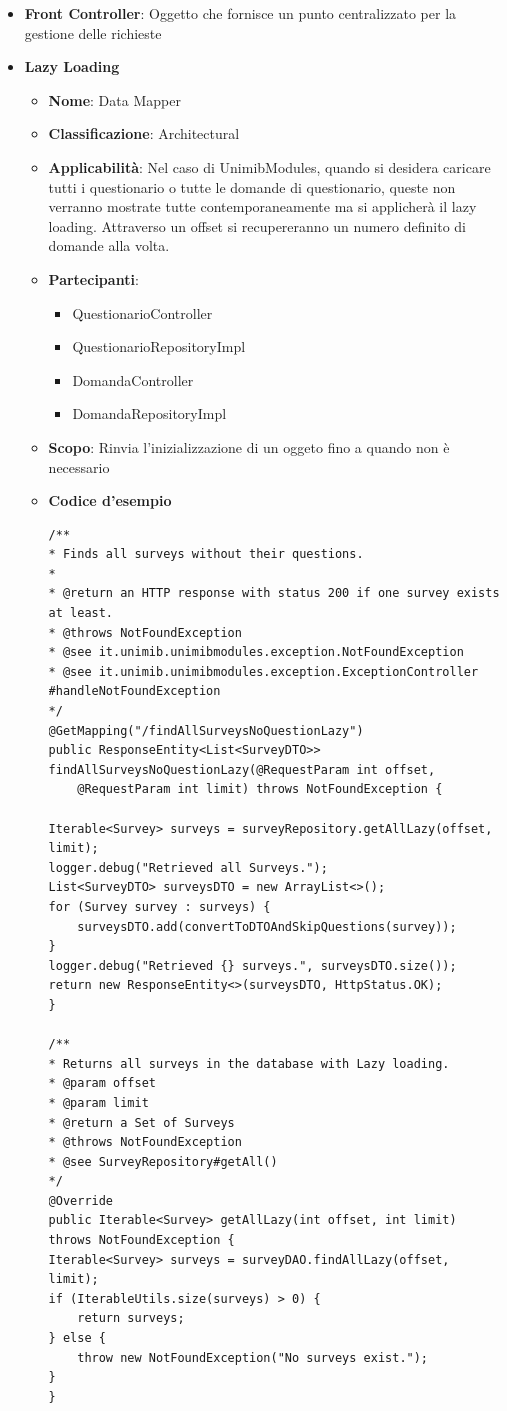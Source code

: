 \documentclass[12pt]{article}
\begin{document}
\begin{itemize}
		
		\item \textbf{Front Controller}: Oggetto che fornisce un punto centralizzato per la gestione delle richieste
		
		
		\item \textbf{Lazy Loading}
		\begin{itemize}
            \item \textbf{Nome}: Data Mapper
            \item \textbf{Classificazione}: Architectural
            \item \textbf{Applicabilità}: Nel caso di UnimibModules, quando si desidera caricare tutti i questionario o tutte le domande di questionario, queste non verranno mostrate tutte contemporaneamente ma si applicherà il lazy loading. Attraverso un offset si recupereranno un numero definito di domande alla volta.
            \item \textbf{Partecipanti}:
                \begin{itemize}
                    \item QuestionarioController
                    \item QuestionarioRepositoryImpl
                    \item DomandaController
                    \item DomandaRepositoryImpl
                \end{itemize}
            \item \textbf{Scopo}: Rinvia l'inizializzazione di un oggeto fino a quando non è necessario
            \item \textbf{Codice d'esempio}
            \begin{lstlisting}
/**
* Finds all surveys without their questions.
* 
* @return an HTTP response with status 200 if one survey exists at least.
* @throws NotFoundException
* @see it.unimib.unimibmodules.exception.NotFoundException
* @see it.unimib.unimibmodules.exception.ExceptionController
#handleNotFoundException
*/
@GetMapping("/findAllSurveysNoQuestionLazy")
public ResponseEntity<List<SurveyDTO>> findAllSurveysNoQuestionLazy(@RequestParam int offset, 
	@RequestParam int limit) throws NotFoundException {

Iterable<Survey> surveys = surveyRepository.getAllLazy(offset, limit);
logger.debug("Retrieved all Surveys.");
List<SurveyDTO> surveysDTO = new ArrayList<>();
for (Survey survey : surveys) {
	surveysDTO.add(convertToDTOAndSkipQuestions(survey));
}
logger.debug("Retrieved {} surveys.", surveysDTO.size());
return new ResponseEntity<>(surveysDTO, HttpStatus.OK);
}

/**
* Returns all surveys in the database with Lazy loading.
* @param offset
* @param limit
* @return a Set of Surveys
* @throws NotFoundException
* @see SurveyRepository#getAll()
*/
@Override
public Iterable<Survey> getAllLazy(int offset, int limit) throws NotFoundException {
Iterable<Survey> surveys = surveyDAO.findAllLazy(offset, limit);
if (IterableUtils.size(surveys) > 0) {
	return surveys;
} else {
	throw new NotFoundException("No surveys exist.");
}
}
            \end{lstlisting}
        \end{itemize}
	\end{itemize}
\end{document}
